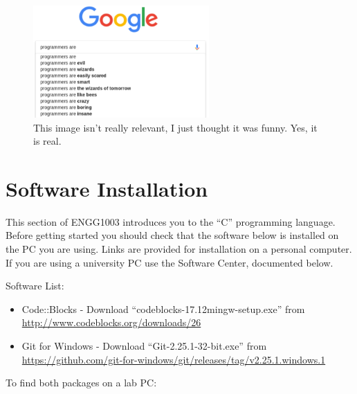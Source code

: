\documentclass{lab}
\begin{document}
\begin{figure}[H]
\begin{center}
\includegraphics[width=0.6\textwidth]{Wk1Images/google.png}
\end{center}
\caption{This image isn't really relevant, I just thought it was funny. Yes, it is real.}
\end{figure}

\pagebreak
\tableofcontents

\pagebreak

\section{Software Installation}

This section of ENGG1003 introduces you to the ``C'' programming language. Before getting started you should check that the software below is installed on the PC you are using. Links are provided for installation on a personal computer. If you are using a university PC use the Software Center, documented below.

Software List:

\begin{itemize}
\item Code::Blocks - Download ``codeblocks-17.12mingw-setup.exe'' from \url{http://www.codeblocks.org/downloads/26}
\item Git for Windows - Download ``Git-2.25.1-32-bit.exe'' from \url{https://github.com/git-for-windows/git/releases/tag/v2.25.1.windows.1}
\end{itemize}

To find both packages on a lab PC:
\end{document}
